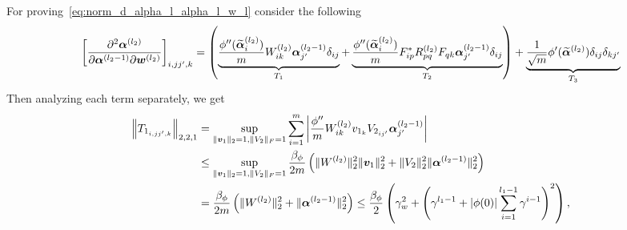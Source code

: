 For proving~\eqref{eq:norm_d_alpha_l_alpha_l_w_l} consider the following
\begin{align*}
        \begin{aligned}
            \left[ 
                \frac{\partial^2 \boldsymbol{\alpha}^{(l_2)}}{\partial \boldsymbol{\alpha}^{(l_2 - 1)}\partial {\bm{w}}^{(l_2)}}
            \right]_{i,jj',k} =\left(
            \underbrace{\frac{\phi''(\widetilde{\boldsymbol{\alpha}}^{(l_2)}_i)  }{m}
                W^{(l_2)}_{ik}\boldsymbol{\alpha}^{(l_2-1)}_{j'}\delta_{ij}}_{T_1}
                + 
                \underbrace{\frac{\phi''(\widetilde{\boldsymbol{\alpha}}^{(l_2)}_i)}{m} F^*_{ip}R^{(l_2)}_{pq}F_{qk}\boldsymbol{\alpha}^{(l_2-1)}_{j'}\delta_{ij}}_{T_2}
            \right)
            + \underbrace{\frac{1}{\sqrt{m}} \phi'(\widetilde{\boldsymbol{\alpha}}^{(l_2)})\delta_{ij}\delta_{kj'}}_{T_3}
        \end{aligned}
    \end{align*}
    Then analyzing each term separately, we get
    \begin{align}
        \begin{aligned}
            \left\|T_{1_{i,jj',k}} \right\|_{2,2,1} 
            &= \sup_{\|{\bm{v}}_1\|_2 = 1, \|V_2\|_F =1} \sum_{i=1}^m
            \left| 
                \frac{\phi''}{m} W^{(l_2)}_{ik}v_{1_k} V_{2_{ij'}}\boldsymbol{\alpha}^{(l_2-1)}_{j'}
            \right|\\
            &\leq \sup_{\|{\bm{v}}_1\|_2 = 1, \|V_2\|_F =1}
            \frac{\beta_{\phi}}{2m} 
            \left( 
                \|W^{(l_2)}\|_2^2 \|{\bm{v}}_1\|_2^2 + \|V_2\|_2^2 \|\boldsymbol{\alpha}^{(l_2-1)}\|_2^2
            \right)\\
            &=
            \frac{\beta_{\phi}}{2m} 
            \left( 
                \|W^{(l_2)}\|_2^2 + \|\boldsymbol{\alpha}^{(l_2-1)}\|_2^2
            \right) \leq\frac{\beta_{\phi}}{2}  
                \left(\gamma_w^2 + \left(\gamma^{l_1-1}+|\phi(0)| \sum_{i=1}^{l_1-1} \gamma^{i-1}\right)^2\right),
        \end{aligned}
    \end{align}
